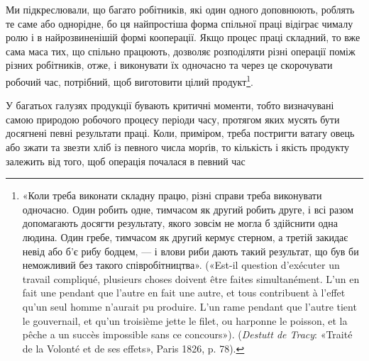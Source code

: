 Ми підкреслювали, що багато робітників, які один одного
доповнюють, роблять те саме або однорідне, бо ця найпростіша
форма спільної праці відіграє чималу ролю і в найрозвиненішій
формі кооперації. Якщо процес праці складний, то вже сама
маса тих, що спільно працюють, дозволяє розподіляти різні
операції поміж різних робітників, отже, і виконувати їх одночасно
та через це скорочувати робочий час, потрібний, щоб виготовити
цілий продукт\footnote{
«Коли треба виконати складну працю, різні справи треба виконувати
одночасно. Один робить одне, тимчасом як другий робить друге,
і всі разом допомагають досягти результату, якого зовсім не могла б здійснити
одна людина. Один гребе, тимчасом як другий кермує стерном, а
третій закидає невід або б'є рибу бодцем, — і влови риби дають такий
результат, що був би неможливий без такого співробітництва». («Est-il
question d’exécuter un travail compliqué, plusieurs choses doivent être
faites simultanément. L’un en fait une pendant que l’autre en fait une
autre, et tous contribuent à l’effet qu’un seul homme n'aurait pu produire.
L’un rame pendant que l’autre tient le gouvernail, et qu’un troisième jette
le filet, ou harponne le poisson, et la pêche a un succès impossible sans
ce concours»). (\emph{Destutt de Tracy}: «Traité de la Volonté et de ses effets»,
Paris 1826, p. 78).
}.

У багатьох галузях продукції бувають критичні моменти,
тобто визначувані самою природою робочого процесу періоди
часу, протягом яких мусять бути досягнені певні результати
праці. Коли, приміром, треба постригти ватагу овець або зжати
та звезти хліб із певного числа морґів, то кількість і якість продукту
залежить від того, щоб операція почалася в певний час
\parbreak{}  %
